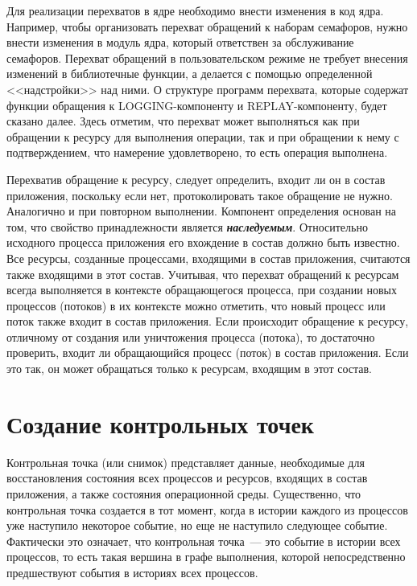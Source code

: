 \begin{multicols}{2}
\begin{enumerate}[(1)]
{}
\end{enumerate}

Для реализации перехватов в ядре необходимо внести изменения в код ядра.
Например, чтобы организовать перехват обращений к наборам семафоров,
нужно внести изменения в модуль ядра, который ответствен за обслуживание
семафоров. Перехват обращений в пользовательском режиме не требует
внесения изменений в библиотечные функции, а делается с помощью
определенной <<надстройки>> над ними. О структуре программ перехвата,
которые содержат функции обращения к LOGGING-компоненту и
REPLAY-компоненту, будет сказано далее. Здесь отметим, что перехват
может выполняться как при обращении к ресурсу для выполнения операции,
так  и при обращении к нему с подтверждением, что намерение удовлетворено,
то есть операция выполнена.

Перехватив обращение к ресурсу, следует определить, входит ли он в состав
приложения, поскольку если нет, протоколировать такое обращение не нужно.
Аналогично и при повторном выполнении. Компонент определения основан на
том, что свойство принадлежности является {\bfseries\textit{на\-сле\-ду\-емым}}.
Относительно исходного процесса приложения его вхождение в состав должно
быть известно. Все ресурсы, созданные процессами, входящими в состав
приложения, считаются также входящими в этот состав. Учитывая, что
перехват обращений к ресурсам всегда выполняется в контексте
обращающегося процесса, при создании новых процессов (потоков) в их
контексте можно отметить, что новый процесс или поток также входит в состав
приложения. Если происходит обращение к ресурсу, отличному от создания
или уничтожения процесса (потока), то достаточно проверить, входит ли
обращающийся процесс (поток) в состав приложения. Если это так, он  может
обращаться только к ресурсам, входящим в этот состав.

\section{Создание контрольных точек}

Контрольная точка (или снимок) пред\-став\-ля\-ет данные, необходимые для
восстановления со\-сто\-яния всех процессов и ресурсов, входящих в состав
приложения, а также состояния операционной среды. Существенно, что
контрольная точка создается в тот момент, когда в истории каждого из
процессов уже наступило некоторое событие, но еще не наступило следующее
событие. Фактически это означает, что контрольная точка~--- это событие в
истории всех
 процессов, то есть такая вершина в графе выполнения, которой
непосредственно предшествуют события в историях всех процессов.


\end{multicols}
